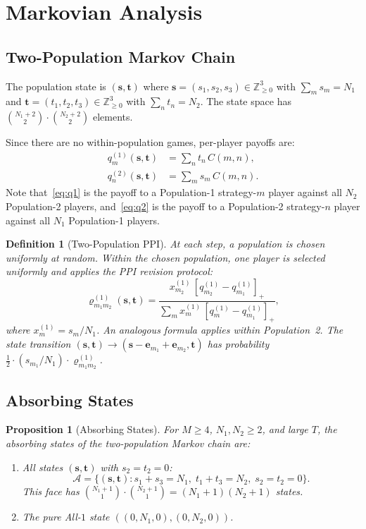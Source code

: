 \documentclass[12pt,a4paper]{article}
\newtheorem{definition}{Definition}[section]
\newtheorem{proposition}{Proposition}[section]
\begin{document}
\section{Markovian Analysis}
\label{sec:markov}

\subsection{Two-Population Markov Chain}

The population state is $(\mathbf{s},\mathbf{t})$ where
$\mathbf{s}=(s_1,s_2,s_3)\in\mathbb{Z}_{\geq0}^3$ with $\sum_m s_m=N_1$ and
$\mathbf{t}=(t_1,t_2,t_3)\in\mathbb{Z}_{\geq0}^3$ with $\sum_n t_n=N_2$.
The state space has $\binom{N_1+2}{2}\cdot\binom{N_2+2}{2}$ elements.

Since there are no within-population games, per-player payoffs are:
\begin{align}
  q_m^{(1)}(\mathbf{s},\mathbf{t}) &= \sum_n t_n\,C(m,n),\label{eq:q1}\\
  q_n^{(2)}(\mathbf{s},\mathbf{t}) &= \sum_m s_m\,C(m,n).\label{eq:q2}
\end{align}
Note that~\eqref{eq:q1} is the payoff to a Population-1 strategy-$m$ player
against all $N_2$ Population-2 players, and~\eqref{eq:q2} is the payoff to a
Population-2 strategy-$n$ player against all $N_1$ Population-1 players.

\begin{definition}[Two-Population PPI]\label{def:PPI}
At each step, a population is chosen uniformly at random.
Within the chosen population, one player is selected uniformly and applies the
PPI revision protocol:
\[
  \varrho_{m_1 m_2}^{(1)}(\mathbf{s},\mathbf{t})
  = \frac{x_{m_2}^{(1)}\,[q_{m_2}^{(1)}-q_{m_1}^{(1)}]_+}
         {\sum_m x_m^{(1)}\,[q_m^{(1)}-q_{m_1}^{(1)}]_+},
\]
where $x_m^{(1)}=s_m/N_1$.  An analogous formula applies within Population~2.
The state transition $(\mathbf{s},\mathbf{t})\to(\mathbf{s}-\mathbf{e}_{m_1}+\mathbf{e}_{m_2},\mathbf{t})$
has probability $\tfrac{1}{2}\cdot(s_{m_1}/N_1)\cdot\varrho_{m_1m_2}^{(1)}$.
\end{definition}

\subsection{Absorbing States}

\begin{proposition}[Absorbing States]\label{prop:abs}
For $M\geq 4$, $N_1,N_2\geq 2$, and large $T$, the absorbing states of the
two-population Markov chain are:
\begin{enumerate}
  \item All states $(\mathbf{s},\mathbf{t})$ with $s_2=t_2=0$:
        \[
          \mathcal{A} = \{(\mathbf{s},\mathbf{t}):
            s_1+s_3=N_1,\; t_1+t_3=N_2,\; s_2=t_2=0\}.
        \]
        This face has $\binom{N_1+1}{1}\cdot\binom{N_2+1}{1}=(N_1+1)(N_2+1)$ states.
  \item The pure All-$1$ state $((0,N_1,0),(0,N_2,0))$.
\end{enumerate}
\end{proposition}
\end{document}
